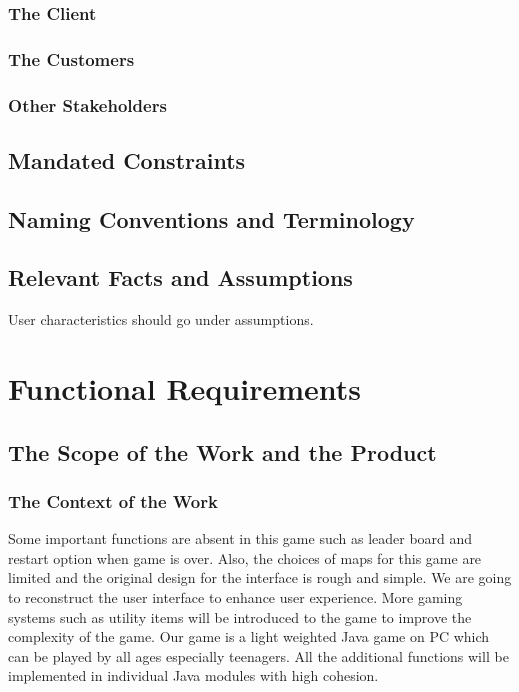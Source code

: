\documentclass[12pt, titlepage]{article}
\begin{document}
\subsubsection{The Client}

\subsubsection{The Customers}

\subsubsection{Other Stakeholders}

\subsection{Mandated Constraints}

\subsection{Naming Conventions and Terminology}

\subsection{Relevant Facts and Assumptions}

User characteristics should go under assumptions.

\section{Functional Requirements}

\subsection{The Scope of the Work and the Product}

\subsubsection{The Context of the Work}
Some important functions are absent in this game such as leader board and restart option when game is over. Also, the choices of maps for this game are limited and the original design for the interface is rough and simple. We are going to reconstruct the user interface to enhance user experience. More gaming systems such as utility items will be introduced to the game to improve the complexity of the game. Our game is a light weighted Java game on PC which can be played by all ages especially teenagers. All the additional functions will be implemented in individual Java modules with high cohesion.
\end{document}

